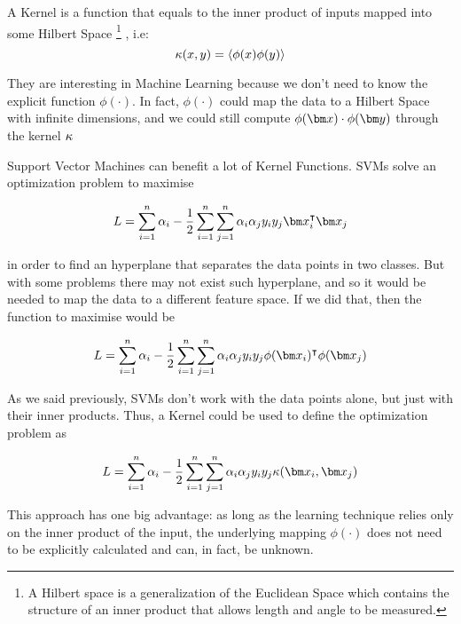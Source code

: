 \begin{pre-delivery}
  A Kernel is a function that equals to the inner product of inputs mapped into
  some Hilbert Space
  \footnote{A Hilbert space is a generalization of the Euclidean Space which contains
  the structure of an inner product that allows length and angle to be
  measured.}
  , i.e:
  \begin{equation}
  \kappa(x,y) = \langle \phi(x)\phi(y) \rangle
\end{equation}

They are interesting in Machine Learning because we don't need to know the
explicit function $\phi(\cdot)$. In fact, $\phi(\cdot)$ could map the data to
a Hilbert Space with infinite dimensions, and we could still compute
$\phi(\vx)\cdot\phi(\vy)$ through the kernel $\kappa$

Support Vector Machines can benefit a lot of Kernel Functions. SVMs solve an
optimization problem to maximise

\begin{equation}
  L = \sum_{i = 1}^n\alpha_i -\frac{1}{2}\sum_{i = 1}^n\sum_{j = 1}^n\alpha_i\alpha_jy_iy_j\vx_i^\transp\vx_j
\end{equation}

in order to find an hyperplane that separates the data points in two classes.
But with some problems there may not exist such hyperplane, and so it would
be needed to map the data to a different feature space. If we did that, then
the function to maximise would be

\begin{equation}
  L = \sum_{i = 1}^n\alpha_i -\frac{1}{2}\sum_{i = 1}^n\sum_{j = 1}^n\alpha_i\alpha_jy_iy_j\phi(\vx_i)^\transp\phi(\vx_j)
\end{equation}

As we said previously, SVMs don't work with the data points alone, but just with
their inner products. Thus, a Kernel could be used to define the optimization
problem as

\begin{equation}
  L = \sum_{i = 1}^n\alpha_i -\frac{1}{2}\sum_{i = 1}^n\sum_{j = 1}^n\alpha_i\alpha_jy_iy_j\kernel(\vx_i, \vx_j)
\end{equation}

This approach has one big advantage:
as long as the learning technique relies
only on the inner product of the input, the underlying mapping $\phi(\cdot)$
does not need to be explicitly calculated and can, in fact, be unknown.


\end{pre-delivery}

